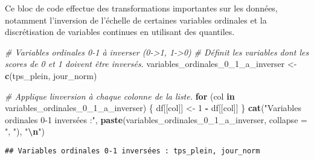 \documentclass[
]{article}
\newenvironment{Shaded}{\begin{snugshade}}{\end{snugshade}}
\newcommand{\AttributeTok}[1]{\textcolor[rgb]{0.13,0.29,0.53}{#1}}
\newcommand{\CommentTok}[1]{\textcolor[rgb]{0.56,0.35,0.01}{\textit{#1}}}
\newcommand{\ControlFlowTok}[1]{\textcolor[rgb]{0.13,0.29,0.53}{\textbf{#1}}}
\newcommand{\DecValTok}[1]{\textcolor[rgb]{0.00,0.00,0.81}{#1}}
\newcommand{\FunctionTok}[1]{\textcolor[rgb]{0.13,0.29,0.53}{\textbf{#1}}}
\newcommand{\NormalTok}[1]{#1}
\newcommand{\OtherTok}[1]{\textcolor[rgb]{0.56,0.35,0.01}{#1}}
\newcommand{\SpecialCharTok}[1]{\textcolor[rgb]{0.81,0.36,0.00}{\textbf{#1}}}
\newcommand{\StringTok}[1]{\textcolor[rgb]{0.31,0.60,0.02}{#1}}
\begin{document}
Ce bloc de code effectue des transformations importantes sur les
données, notamment l'inversion de l'échelle de certaines variables
ordinales et la discrétisation de variables continues en utilisant des
quantiles.

\begin{Shaded}
\begin{Highlighting}[]
\CommentTok{\# Variables ordinales 0{-}1 à inverser (0{-}\textgreater{}1, 1{-}\textgreater{}0)}
\CommentTok{\# Définit les variables dont les scores de 0 et 1 doivent être inversés.}
\NormalTok{variables\_ordinales\_0\_1\_a\_inverser }\OtherTok{\textless{}{-}} \FunctionTok{c}\NormalTok{(}\StringTok{\textquotesingle{}tps\_plein\textquotesingle{}}\NormalTok{, }\StringTok{\textquotesingle{}jour\_norm\textquotesingle{}}\NormalTok{)}

\CommentTok{\# Applique l\textquotesingle{}inversion à chaque colonne de la liste.}
\ControlFlowTok{for}\NormalTok{ (col }\ControlFlowTok{in}\NormalTok{ variables\_ordinales\_0\_1\_a\_inverser) \{}
\NormalTok{  df[[col]] }\OtherTok{\textless{}{-}} \DecValTok{1} \SpecialCharTok{{-}}\NormalTok{ df[[col]]}
\NormalTok{\}}
\FunctionTok{cat}\NormalTok{(}\StringTok{"Variables ordinales 0{-}1 inversées :"}\NormalTok{, }\FunctionTok{paste}\NormalTok{(variables\_ordinales\_0\_1\_a\_inverser, }\AttributeTok{collapse =} \StringTok{", "}\NormalTok{), }\StringTok{"}\SpecialCharTok{\textbackslash{}n}\StringTok{"}\NormalTok{)}
\end{Highlighting}
\end{Shaded}

\begin{verbatim}
## Variables ordinales 0-1 inversées : tps_plein, jour_norm
\end{verbatim}
\end{document}
